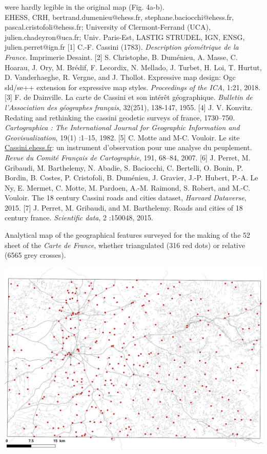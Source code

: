 \documentclass[portrait,a0]{sciposter}
\begin{document}
\begin{minipage}[b]{\textwidth}
\begin{multicols}{3}
were hardly legible in the original map (Fig. 4a-b).\\
    \vfill
    \small
     EHESS, CRH, bertrand.dumenieu@ehess.fr, stephane.baciocchi@ehess.fr, pascal.cristofoli@ehess.fr;  University of Clermont-Ferrand (UCA), julien.chadeyron@uca.fr;  Univ. Paris-Est, LASTIG STRUDEL, IGN, ENSG, julien.perret@ign.fr
    \vfill
    [1] C.-F. Cassini (1783). \textit{Description géométrique de la France}. Imprimerie Desaint.
    [2] S. Christophe, B. Duménieu, A. Masse, C. Hoarau, J. Ory, M. Brédif, F. Lecordix, N. Mellado, J. Turbet, H. Loi, T. Hurtut, D. Vanderhaeghe, R. Vergne, and J. Thollot. Expressive map design: Ogc sld/se++ extension for expressive map styles. \textit{Proceedings of the ICA}, 1:21, 2018.
    [3] F. de Dainville. La carte de Cassini et son intérêt géographique. \textit{Bulletin de l'Association des géographes français}, 32(251), 138-147, 1955.
    [4] J. V. Konvitz. Redating and rethinking the cassini geodetic surveys of france, 1730–750. \textit{Cartographica : The International Journal for Geographic Information and Geovisualization}, 19(1) :1–15, 1982.
    [5] C. Motte and M-C. Vouloir. Le site \href{http://cassini.ehess.fr}{Cassini.ehess.fr}: un instrument d’observation pour une analyse du peuplement. \textit{Revue du Comité Français de Cartographie}, 191, 68–84, 2007.
    [6] J. Perret, M. Gribaudi, M. Barthelemy, N. Abadie, S. Baciocchi, C. Bertelli, O. Bonin, P. Bordin, B. Costes, P. Cristofoli, B. Duménieu, J. Gravier, J.-P. Hubert, P.-A. Le Ny, E. Mermet, C. Motte, M. Pardoen, A.-M. Raimond, S. Robert, and M.-C. Vouloir. The 18 century Cassini roads and cities dataset, \textit{Harvard Dataverse}, 2015.
    [7] J. Perret, M. Gribaudi, and M. Barthelemy. Roads and cities of 18 century france. \textit{Scientific data}, 2 :150048, 2015.
    \begin{center}
         \captionsetup{type=figure}
      \caption{Analytical map of the geographical features surveyed for the making of the 52 sheet of the \textit{Carte de France}, whether triangulated (316 red dots) or relative (\num{6565} grey crosses).}
      \label{map:triangulated-relative}
      \vspace{-0.5cm}\includegraphics[width=0.95\linewidth,trim= 0cm 0cm 0cm 2cm, clip]{gfx/Triangulated.png}

\end{center}
\end{multicols}
\end{minipage}
\end{document}
